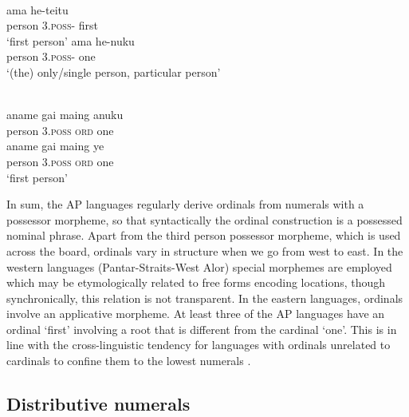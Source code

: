 \ea%
\label{bkm:Ref342651068}
\\
\ea
\gll ama     he-teitu\\  
    person    3\textsc{.poss-}  first  \\
\glt`first person'
\ex
\gll ama     he-nuku\\  
  person    3\textsc{.poss- } one  \\
\glt `(the) only/single person,  particular person'
\z\z

 


\ea%
\label{bkm:Ref342651067}
\\
 
\ea
\gll aname    gai  maing   anuku\\  
     person    3\textsc{.poss   ord } one\\ 
\ex
\gll aname    gai  maing   ye\\
    person    3\textsc{.poss   ord } one\\
\glt `first person'
\z\z
 

      

In sum, the AP languages regularly derive ordinals from numerals with a possessor morpheme, so that syntactically the ordinal construction is a possessed nominal phrase. Apart from the third person possessor morpheme, which is used across the board, ordinals vary in structure when we go from west to east. In the western languages (Pantar-Straits-West Alor) special morphemes are employed which may be etymologically related to free forms encoding locations, though synchronically, this relation is not transparent. In the eastern languages, ordinals involve an applicative morpheme. At least three of the AP languages have an ordinal `first' involving a root that is different from the cardinal `one'. This is in line with the cross-linguistic tendency for languages with ordinals unrelated to cardinals to confine them to the lowest numerals \citep{StolzEtAl2013}.

\subsection{Distributive numerals}
\label{sec:8:Distributive}
